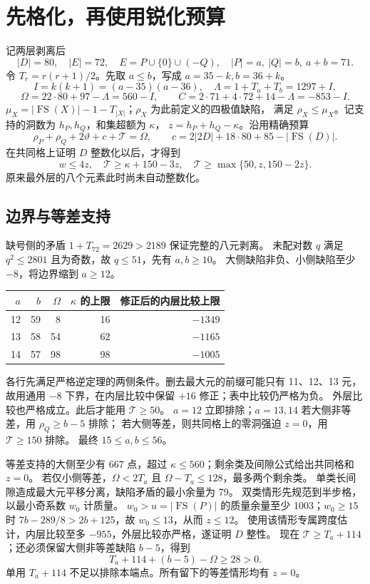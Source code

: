 \documentclass[11pt,a4paper]{article}
\newcommand{\FS}{\operatorname{FS}}
\newcommand{\T}{\mathcal T}
\theoremstyle{definition}
\begin{document}
\section{先格化，再使用锐化预算}\label{lattice}
记两层剥离后
\[
 |D|=80,\quad |E|=72,\quad E=P\cup\{0\}\cup(-Q),\quad
 |P|=a,\ |Q|=b,\ a+b=71.
\]
令 $T_r=r(r+1)/2$。先取 $a\le b$，写成 $a=35-k,b=36+k$。
\[
 I=k(k+1)=(a-35)(a-36),\quad
 \Lambda=1+T_a+T_b=1297+I,
\]
\[
 \Omega=22\cdot80+97-\Lambda=560-I,\qquad
 C=2\cdot71+4\cdot72+14-\Lambda=-853-I.
\]
$\mu_X=|\FS(X)|-1-T_{|X|}$；$\rho_X$ 为此前定义的四极值缺陷，
满足 $\rho_X\le\mu_X$。记支持的洞数为 $h_P,h_Q$，和集超额为 $\kappa$，
$z=h_P+h_Q-\kappa$。沿用精确预算
\begin{equation}\label{budget}
 \rho_P+\rho_Q+2\vartheta+c+\T=\Omega,
 \qquad c=2|2D|+18\cdot80+85-|\FS(D)|.
\end{equation}
在共同格上证明 $D$ 整数化以后，才得到
\begin{equation}\label{post}
 w\le4z,\quad \T\ge\kappa+150-3z,\quad
 \T\ge\max\{50,z,150-2z\}.
\end{equation}
原来最外层的八个元素此时尚未自动整数化。

\subsection{边界与等差支持}
缺号侧的矛盾 $1+T_{72}=2629>2189$ 保证完整的八元剥离。
未配对数 $q$ 满足 $q^2\le2801$ 且为奇数，故 $q\le51$，先有 $a,b\ge10$。
大侧缺陷非负、小侧缺陷至少 $-8$，将边界缩到 $a\ge12$。
\begin{center}\begin{tabular}{rrrrr}\toprule
$a$&$b$&$\Omega$&$\kappa$ 的上限&修正后的内层比较上限\\\midrule
12&59&8&16&$-1349$\\
13&58&54&62&$-1165$\\
14&57&98&98&$-1005$\\\bottomrule
\end{tabular}\end{center}
各行先满足严格逆定理的两侧条件。删去最大元的前缀可能只有 11、12、13 元，
故用通用 $-8$ 下界，在内层比较中保留 $+16$ 修正；表中比较仍严格为负。
外层比较也严格成立。此后才能用 $\T\ge50$。
$a=12$ 立即排除；$a=13,14$ 若大侧非等差，用 $\rho_Q\ge b-5$ 排除；
若大侧等差，则共同格上的零洞强迫 $z=0$，用 $\T\ge150$ 排除。
最终 $15\le a,b\le56$。

等差支持的大侧至少有 $667$ 点，超过 $\kappa\le560$；剩余类及间隙公式给出共同格和 $z=0$。
若仅小侧等差，$\Omega<2T_a$ 且 $\Omega-T_a\le128$，最多两个剩余类。
单类长间隙造成最大元平移分离，缺陷矛盾的最小余量为 79。
双类情形先规范到半步格，以最小奇系数 $w_0$ 计质量。
$w_0>u=|\FS(P)|$ 的质量余量至少 1003；$w_0\ge15$ 时
$7b-289/8>2b+125$，故 $w_0\le13$，从而 $z\le12$。
使用该情形专属跨度估计，内层比较至多 $-955$，外层比较亦严格，遂证明 $D$ 整性。
现在 $\T\ge T_a+114$；还必须保留大侧非等差缺陷 $b-5$，得到
\[
 T_a+114+(b-5)-\Omega\ge28>0.
\]
单用 $T_a+114$ 不足以排除本端点。所有留下的等差情形均有 $z=0$。
\end{document}
